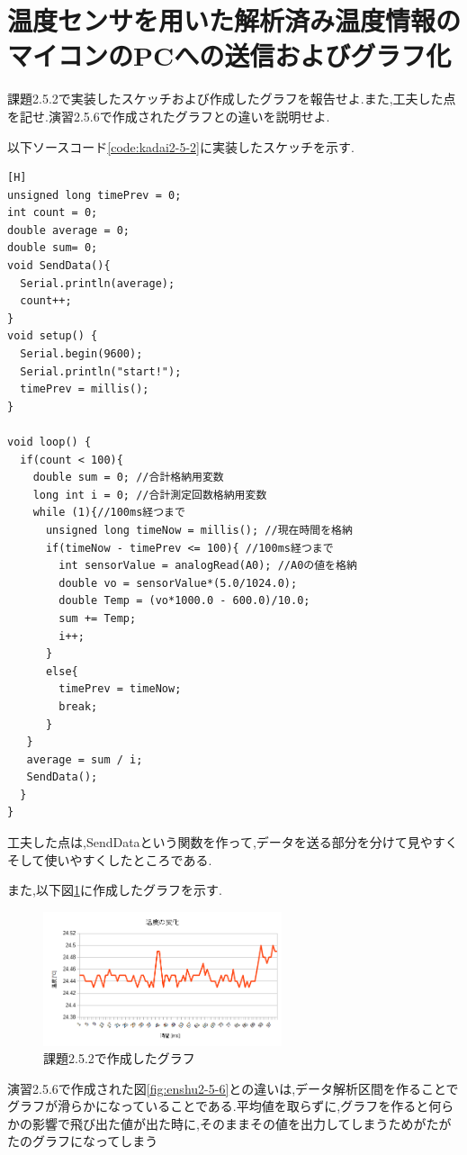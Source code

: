 \documentclass{jarticle}
\begin{document}
\section{温度センサを用いた解析済み温度情報のマイコンのPCへの送信およびグラフ化}
課題2.5.2で実装したスケッチおよび作成したグラフを報告せよ.また,工夫した点を記せ.演習2.5.6で作成されたグラフとの違いを説明せよ.

以下ソースコード\ref{code:kadai2-5-2}に実装したスケッチを示す.
\begin{lstlisting}[caption = 課題2.5.2,label=code:kadai2-5-2][H]
unsigned long timePrev = 0;
int count = 0;
double average = 0;
double sum= 0;
void SendData(){
  Serial.println(average);
  count++;
}
void setup() {
  Serial.begin(9600);
  Serial.println("start!");
  timePrev = millis();
}

void loop() {
  if(count < 100){
    double sum = 0; //合計格納用変数
    long int i = 0; //合計測定回数格納用変数
    while (1){//100ms経つまで
      unsigned long timeNow = millis(); //現在時間を格納
      if(timeNow - timePrev <= 100){ //100ms経つまで
        int sensorValue = analogRead(A0); //A0の値を格納
        double vo = sensorValue*(5.0/1024.0);
        double Temp = (vo*1000.0 - 600.0)/10.0;
        sum += Temp;
        i++;
      }
      else{
        timePrev = timeNow;
        break;
      }
   }
   average = sum / i;
   SendData();
  }
}
\end{lstlisting}
工夫した点は,SendDataという関数を作って,データを送る部分を分けて見やすくそして使いやすくしたところである.

また,以下図\ref{fig:kadai2-5-2}に作成したグラフを示す.

\begin{figure}[H]
\begin{center}
\includegraphics[width=7.0cm]{images/kadai2-5-2.png}
\caption{課題2.5.2で作成したグラフ}
\label{fig:kadai2-5-2}
\end{center}
\end{figure}

演習2.5.6で作成された図\ref{fig:enshu2-5-6}との違いは,データ解析区間を作ることでグラフが滑らかになっていることである.平均値を取らずに,グラフを作ると何らかの影響で飛び出た値が出た時に,そのままその値を出力してしまうためがたがたのグラフになってしまう
\end{document}
